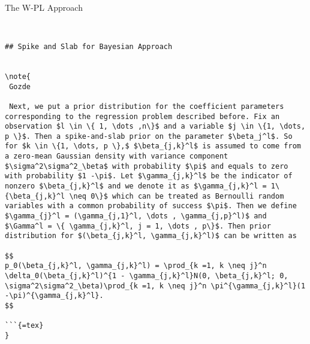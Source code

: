 \documentclass[
  ignorenonframetext,
]{beamer}
\begin{document}
\begin{frame}[fragile]{The W-PL Approach}
\protect\hypertarget{the-w-pl-approach-2}{}

\begin{verbatim}


## Spike and Slab for Bayesian Approach


\note{
 Gozde
 
 Next, we put a prior distribution for the coefficient parameters corresponding to the regression problem described before. Fix an observation $l \in \{ 1, \dots ,n\}$ and a variable $j \in \{1, \dots, p \}$. Then a spike-and-slab prior on the parameter $\beta_j^l$. So for $k \in \{1, \dots, p \},$ $\beta_{j,k}^l$ is assumed to come from a zero-mean Gaussian density with variance component $\sigma^2\sigma^2_\beta$ with probability $\pi$ and equals to zero with probability $1 -\pi$. Let $\gamma_{j,k}^l$ be the indicator of nonzero $\beta_{j,k}^l$ and we denote it as $\gamma_{j,k}^l = 1\{\beta_{j,k}^l \neq 0\}$ which can be treated as Bernoulli random variables with a common probability of success $\pi$. Then we define $\gamma_{j}^l = (\gamma_{j,1}^l, \dots , \gamma_{j,p}^l)$ and $\Gamma^l = \{ \gamma_{j,k}^l, j = 1, \dots , p\}$. Then prior distribution for $(\beta_{j,k}^l, \gamma_{j,k}^l)$ can be written as  

$$
p_0(\beta_{j,k}^l, \gamma_{j,k}^l) = \prod_{k =1, k \neq j}^n \delta_0(\beta_{j,k}^l)^{1 - \gamma_{j,k}^l}N(0, \beta_{j,k}^l; 0, \sigma^2\sigma^2_\beta)\prod_{k =1, k \neq j}^n \pi^{\gamma_{j,k}^l}(1 -\pi)^{\gamma_{j,k}^l}.
$$ 

```{=tex}
}
\end{verbatim}
\end{frame}
\end{document}
